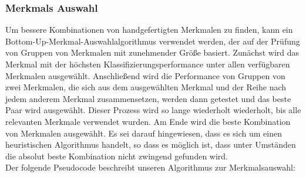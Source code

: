 \subsubsection{Merkmals Auswahl} \label{featureSelection-1}

Um bessere Kombinationen von handgefertigten Merkmalen zu finden, kann ein Bottom-Up-Merkmal-Auswahlalgorithmus verwendet werden, der auf der Pr{\"u}fung von Gruppen von Merkmalen mit zunehmender Gr{\"o}{\ss}e basiert.
Zun{\"a}chst wird das Merkmal mit der h{\"o}chsten Klassifizierungsperformance unter allen verf{\"u}gbaren Merkmalen ausgew{\"a}hlt. 
Anschlie{\ss}end wird die Performance von Gruppen von zwei Merkmalen, die sich aus dem ausgew{\"a}hlten Merkmal und der Reihe nach jedem anderem Merkmal zusammensetzen, werden dann getestet und das beste Paar wird ausgew{\"a}hlt. 
Dieser Prozess wird so lange wiederholt wiederholt, bis alle relevanten Merkmale verwendet wurden. 
Am Ende wird die beste Kombination von Merkmalen ausgew{\"a}hlt.
Es sei darauf hingewiesen, dass es sich um einen heuristischen Algorithmus handelt, so dass es m{\"o}glich ist, dass unter Umst{\"a}nden die absolut beste Kombination nicht zwingend gefunden wird. \\

Der folgende Pseudocode beschreibt unseren Algorithmus zur Merkmalsauswahl: \\


